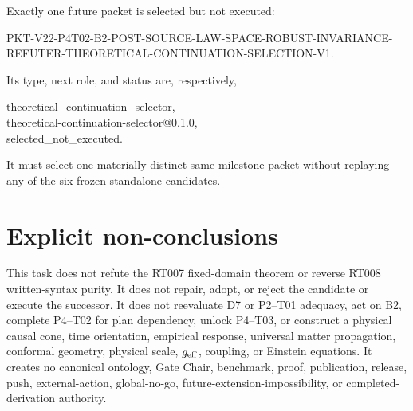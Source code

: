 \documentclass[11pt]{article}
\begin{document}
Exactly one future packet is selected but not executed:
\begin{flushleft}
\small\ttfamily
PKT-V22-P4T02-B2-POST-SOURCE-LAW-SPACE-ROBUST-INVARIANCE-\\
REFUTER-THEORETICAL-CONTINUATION-SELECTION-V1.
\end{flushleft}
Its type, next role, and status are, respectively,
\begin{flushleft}
\small\ttfamily
theoretical\_continuation\_selector,\\
theoretical-continuation-selector@0.1.0,\\
selected\_not\_executed.
\end{flushleft}
It must select one materially distinct
same-milestone packet without replaying any of the six frozen standalone
candidates.

\section{Explicit non-conclusions}

This task does not refute the RT007 fixed-domain theorem or reverse RT008
written-syntax purity.  It does not repair, adopt, or reject the candidate or
execute the successor.  It does not reevaluate D7 or P2--T01 adequacy, act on
B2, complete P4--T02 for plan dependency, unlock P4--T03, or construct a
physical causal cone, time orientation, empirical response, universal matter
propagation, conformal geometry, physical scale, \(g_{\rm eff}\), coupling,
or Einstein equations.  It creates no canonical ontology, Gate Chair,
benchmark, proof, publication, release, push, external-action, global-no-go,
future-extension-impossibility, or completed-derivation authority.
\end{document}

